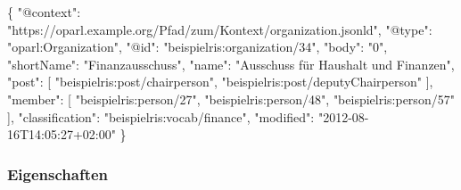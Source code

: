 \documentclass[,a4paper]{article}
\newenvironment{Shaded}{}{}
\newcommand{\DataTypeTok}[1]{\textcolor[rgb]{0.56,0.13,0.00}{{#1}}}
\newcommand{\StringTok}[1]{\textcolor[rgb]{0.25,0.44,0.63}{{#1}}}
\newcommand{\OtherTok}[1]{\textcolor[rgb]{0.00,0.44,0.13}{{#1}}}
\newcommand{\FunctionTok}[1]{\textcolor[rgb]{0.02,0.16,0.49}{{#1}}}
\begin{document}
\begin{Shaded}
\begin{Highlighting}[]
\FunctionTok{\{}
    \DataTypeTok{"@context"}\FunctionTok{:} \StringTok{"https://oparl.example.org/Pfad/zum/Kontext/organization.jsonld"}\FunctionTok{,}
    \DataTypeTok{"@type"}\FunctionTok{:} \StringTok{"oparl:Organization"}\FunctionTok{,}
    \DataTypeTok{"@id"}\FunctionTok{:} \StringTok{"beispielris:organization/34"}\FunctionTok{,}
    \DataTypeTok{"body"}\FunctionTok{:} \StringTok{"0"}\FunctionTok{,}
    \DataTypeTok{"shortName"}\FunctionTok{:} \StringTok{"Finanzausschuss"}\FunctionTok{,}
    \DataTypeTok{"name"}\FunctionTok{:} \StringTok{"Ausschuss für Haushalt und Finanzen"}\FunctionTok{,}
    \DataTypeTok{"post"}\FunctionTok{:} \OtherTok{[}
        \StringTok{"beispielris:post/chairperson"}\OtherTok{,}
        \StringTok{"beispielris:post/deputyChairperson"}
    \OtherTok{]}\FunctionTok{,}
    \DataTypeTok{"member"}\FunctionTok{:} \OtherTok{[}
        \StringTok{"beispielris:person/27"}\OtherTok{,}
        \StringTok{"beispielris:person/48"}\OtherTok{,}
        \StringTok{"beispielris:person/57"}
    \OtherTok{]}\FunctionTok{,}
    \DataTypeTok{"classification"}\FunctionTok{:} \StringTok{"beispielris:vocab/finance"}\FunctionTok{,}
    \DataTypeTok{"modified"}\FunctionTok{:} \StringTok{"2012-08-16T14:05:27+02:00"}
\FunctionTok{\}}
\end{Highlighting}
\end{Shaded}

\subsubsection{Eigenschaften}\label{eigenschaften-2}
\end{document}

